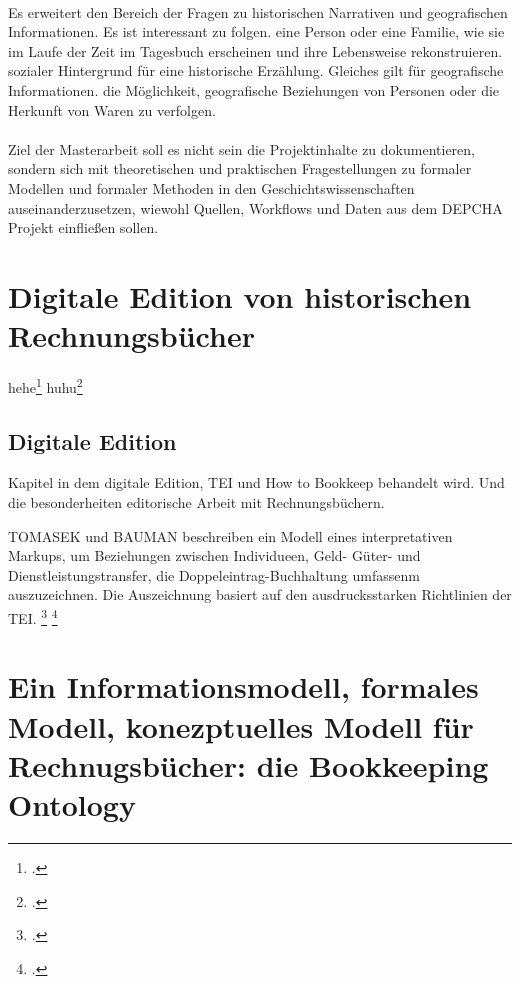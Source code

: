 \documentclass[12pt,a4paper]{article}
\begin{document}
\\
Es erweitert den Bereich der Fragen zu historischen Narrativen und geografischen Informationen. Es ist interessant zu folgen.
eine Person oder eine Familie, wie sie im Laufe der Zeit im Tagesbuch erscheinen und ihre Lebensweise rekonstruieren. 
sozialer Hintergrund für eine historische Erzählung. Gleiches gilt für geografische Informationen.
die Möglichkeit, geografische Beziehungen von Personen oder die Herkunft von Waren zu verfolgen.
\\
\\
Ziel der Masterarbeit soll es nicht sein die Projektinhalte zu dokumentieren, sondern sich mit theoretischen und praktischen Fragestellungen zu formaler Modellen und formaler Methoden in den Geschichtswissenschaften  auseinanderzusetzen, wiewohl Quellen, Workflows und Daten aus dem DEPCHA Projekt einfließen sollen.

\section{Digitale Edition von historischen Rechnungsbücher}
\label{subsec:DigEdHiRe}

hehe\footcite[Vgl.][]{sahle2013digitale}
huhu\footcite[Vgl][S.234-252]{jannidis2017digital} 

\subsection{Digitale Edition}
Kapitel in dem digitale Edition, TEI und How to Bookkeep behandelt wird. Und die besonderheiten editorische Arbeit mit Rechnungsbüchern. 

TOMASEK und BAUMAN beschreiben ein Modell eines interpretativen Markups, um Beziehungen zwischen Individueen, Geld- Güter- und Dienstleistungstransfer, die Doppeleintrag-Buchhaltung umfassenm auszuzeichnen. Die Auszeichnung basiert auf den ausdrucksstarken Richtlinien der TEI. \footcite[Vgl.][S.1-2, \protect\url{http://journals.openedition.org/jtei/895}, 08.03.2018]{tomasek2013encoding}
\footcite[][S.41-44]{kobler2010qualitat}

\section{Ein Informationsmodell, formales Modell, konezptuelles Modell  für Rechnugsbücher: die Bookkeeping Ontology}
\end{document}
